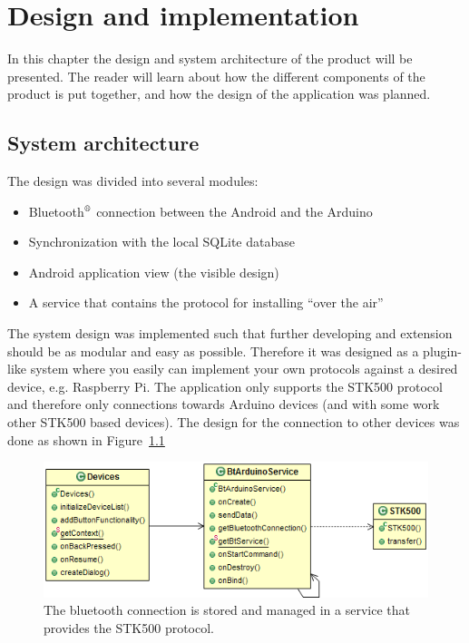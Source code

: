 \chapter{Design and implementation}
In this chapter the design and system architecture of the product will be presented. The reader will learn about how the different components of the product is put together, and how the design of the application was planned.

\section{System architecture}
	The design was divided into several modules:
	\begin{itemize}
		\item{Bluetooth$\textsuperscript{\textregistered}$ connection between the Android and the Arduino}
		\item{Synchronization with the local SQLite database}
		\item{Android application view (the visible design)}
		\item{A service that contains the protocol for installing ``over the air''}
	\end{itemize}
	\vspace{0.2in}
	
	The system design was implemented such that further developing and extension should be as modular and easy as possible.
	Therefore it was designed as a plugin-like system where you easily can implement your own protocols against a desired device, e.g. Raspberry Pi. The application only supports the STK500 protocol and therefore only connections towards Arduino devices (and with some work other STK500 based devices).
	The design for the connection to other devices was done as shown in Figure~\ref{fig:btconnection}\\

	\begin{figure}[H]
	\centering
	\includegraphics[width=130mm]{images/BTConnection.png}
	\caption[BT connection in service]{The bluetooth connection is stored and managed in a service that provides the STK500 protocol.}
	\label{fig:btconnection}
	\end{figure}

